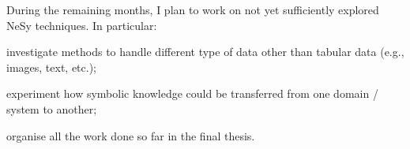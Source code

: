 \documentclass[]{scrartcl}
\begin{document}
    During the remaining months, I plan to work on not yet sufficiently explored NeSy techniques.
    In particular:
    \begin{inlinelist}
        \item investigate methods to handle different type of data other than tabular data (e.g., images, text, etc.);
        \item experiment how symbolic knowledge could be transferred from one domain / system to another;
        \item organise all the work done so far in the final thesis.
    \end{inlinelist}


    
    
    
    
    
\end{document}
